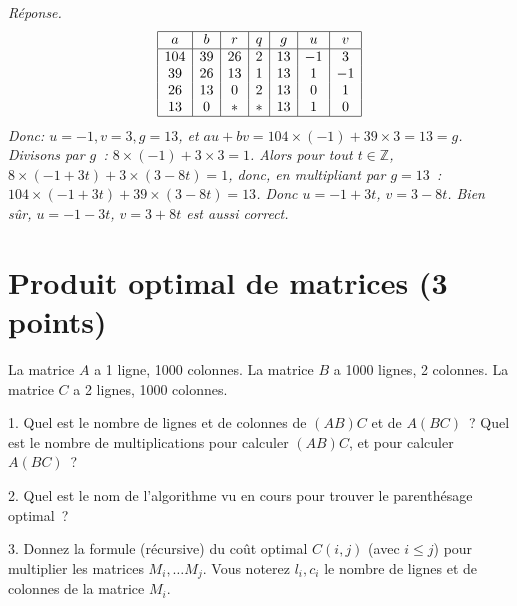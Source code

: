 \documentclass[11pt]{article}
\def\Z{\mathbb Z}
\begin{document}
\ifcorrige
{\it Réponse.
$$\begin{array}{|c|c|c|c|c|c|c|}
\hline
a & b & r & q & g & u & v \\
\hline
104 & 39 & 26 & 2 & 13 & -1 & 3 \\
39 & 26 & 13 & 1 & 13 & 1 & -1 \\
26 & 13 & 0 & 2 & 13 & 0 & 1 \\
13 & 0 & * & * & 13 & 1 & 0 \\
\hline
\end{array}
$$
Donc: $u=-1, v=3, g=13$, et $au+bv=104\times  (-1) + 39\times 3= 13=g$.
Divisons par $g$~: $8\times (-1) + 3\times 3=1$. Alors pour tout $t\in \Z$,
$8\times (-1+3t) + 3\times (3-8t)=1$, donc, en multipliant par $g=13$~: $104\times (-1+3t) + 39\times (3-8t)=13$.
Donc $u=-1+3t$, $v=3-8t$. Bien sûr, $u=-1-3t$, $v=3+8t$ est aussi correct.
}
\else\fi

\section{Produit optimal de matrices (3 points)}
La matrice $A$ a 1 ligne, 1000 colonnes.
La matrice $B$ a 1000 lignes, 2 colonnes.
La matrice $C$ a 2 lignes, 1000 colonnes.
 

1. Quel est le nombre de lignes et de colonnes de $(AB)C$ et de $A(BC)$~?
Quel est le nombre de multiplications pour calculer $(AB)C$, et pour calculer $A(BC)$~?

2. Quel est le nom de l'algorithme vu en cours pour trouver le parenthésage optimal~?

 

3. Donnez la formule (récursive) du coût optimal $C(i, j)$ (avec $i\le j$) pour multiplier les matrices
$M_i, \ldots M_j$. Vous noterez $l_i, c_i$ le nombre de lignes et de colonnes de la matrice $M_i$.

\else\fi
\end{document}
